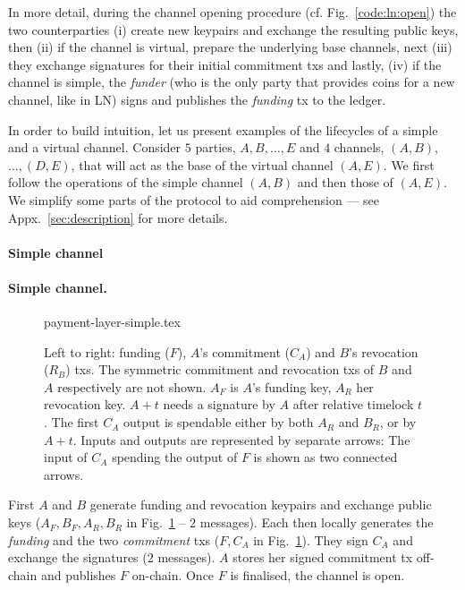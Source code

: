   In more detail, during the channel opening procedure (cf.
  Fig.~\ref{code:ln:open}) the two counterparties (i) create new keypairs and
  exchange the resulting public keys, then (ii) if the channel is
  virtual, prepare the underlying base channels, next (iii) they exchange
  signatures for their initial commitment txs
  and lastly, (iv) if the channel is simple, the \emph{funder} (who is the only
  party that provides coins for a new channel, like in LN) signs and publishes
  the \emph{funding} tx to the ledger.

  In order to build intuition, let us present examples of the
  lifecycles of a simple and a virtual channel. Consider $5$ parties, $A, B,
  \dots, E$ and $4$ channels, $(A, B)$, $\dots,(D, E)$, that will act as
  the base of the virtual channel $(A, E)$. We first follow the operations of
  the simple channel $(A, B)$ and then those of $(A, E)$. We simplify some parts
  of the protocol to aid comprehension --- see Appx.~\ref{sec:description} for
  more details.

  \makeatletter%
    {\paragraph{Simple channel}}%
    {\paragraph{Simple channel.}}%
  \makeatother%
  \addtolength{\intextsep}{-15pt}
  \begin{figure}[!htbp]
    \centering
    {payment-layer-simple.tex}
    \caption{Left to right: funding ($F$), $A$'s commitment ($C_A$) and $B$'s
    revocation ($R_B$) txs.
    The symmetric commitment and
    revocation txs of $B$ and $A$ respectively are not shown.
    $A_F$ is $A$'s funding key, $A_R$ her revocation key. $A+t$ needs a signature
    by $A$ after relative timelock $t$. The first $C_A$ output is
    spendable either by both $A_R$ and $B_R$, or by $A + t$. Inputs and outputs are
    represented by separate arrows: The input of $C_A$ spending the output of
    $F$ is shown as two connected arrows.}%
    \label{figure:payment-layer-simple}
  \end{figure}
  \addtolength{\intextsep}{15pt}

  First $A$ and $B$ generate funding and revocation keypairs and exchange
  public keys ($A_F, B_F, A_R, B_R$ in Fig.~\ref{figure:payment-layer-simple} --
  $2$ messages). Each then
  locally generates the \emph{funding} and the two \emph{commitment} txs
  ($F, C_A$ in Fig.~\ref{figure:payment-layer-simple}). They
  sign $C_A$ and exchange the
  signatures ($2$ messages). $A$ stores her
  signed commitment tx off-chain and publishes $F$ on-chain. Once $F$
  is finalised, the channel is open.

